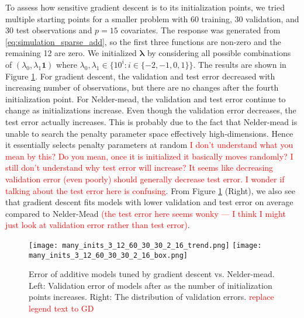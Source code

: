 \documentclass[12pt,letterpaper]{article}
\begin{document}
To assess how sensitive gradient descent is to its initialization points, we tried multiple starting points for a smaller problem with 60 training, 30 validation, and 30 test observations and $p = 15$ covariates. The response was generated from \eqref{eq:simulation_sparse_add}, so the first three functions are non-zero and the remaining 12 are zero. We initialized $\boldsymbol{\lambda}$ by considering all possible combinations of $(\lambda_0, \lambda_1 \boldsymbol{1})$ where $\lambda_0, \lambda_1 \in \{10^i: i\in\{-2, -1, 0, 1\}\}$. The results are shown in Figure \ref{fig:mult_starts}. For gradient descent, the validation and test error decreased with increasing number of observations, but there are no changes after the fourth initialization point. For Nelder-mead, the validation and test error continue to change as initializations increase. Even though the validation error decreases, the test error actually increases. This is probably due to the fact that Nelder-mead is unable to search the penalty parameter space effectively high-dimensions. Hence it essentially selects penalty parameters at random \textcolor{red}{I don't understand what you mean by this? Do you mean, once it is initialized it basically moves randomly? I still don't understand why test error will increase? It seems like decreasing validation error (even poorly) should generally decrease test error. I wonder if talking about the test error here is confusing}. From Figure \ref{fig:mult_starts} (Right), we also see that gradient descent fits models with lower validation and test error on average compared to Nelder-Mead \textcolor{red}{(the test error here seems wonky --- I think I might just look at validation error rather than test error)}.

\begin{figure}
	\label{fig:mult_starts}
	\caption{Error of additive models tuned by gradient descent vs. Nelder-mead. Left: Validation error of models after as the number of initialization points increases. Right: The distribution of validation errors.
	\textcolor{red}{replace legend text to GD}
	}
	\centering
	\texttt{[image: many\_inits\_3\_12\_60\_30\_30\_2\_16\_trend.png]}
	\texttt{[image: many\_inits\_3\_12\_60\_30\_30\_2\_16\_box.png]}
\end{figure}
\end{document}
